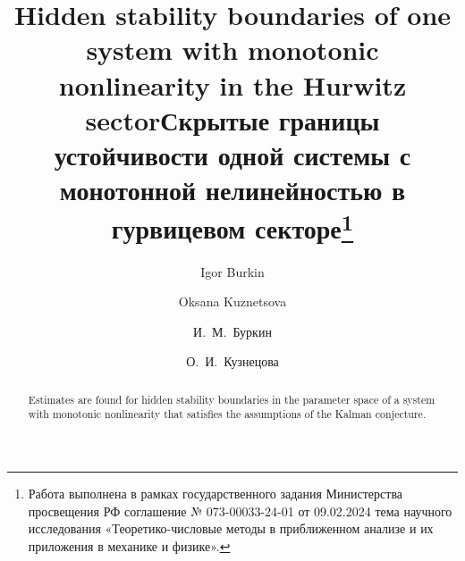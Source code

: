\begin{englishtitle} %
\title{Hidden stability boundaries of one system with monotonic nonlinearity in the Hurwitz sector}
\author{Igor Burkin  \and  Oksana Kuznetsova
}

\maketitle

\begin{abstract}
Estimates are found for hidden stability boundaries in the parameter space of a system with monotonic nonlinearity that satisfies the assumptions of the Kalman conjecture. 

\end{abstract}
\end{englishtitle}

\iffalse
%
%


\documentclass[12pt]{llncs}  


\usepackage{iftex}

\ifPDFTeX
\usepackage[T2A]{fontenc}
\usepackage[utf8]{inputenc} %
\usepackage[english,russian]{babel}
\fi

\usepackage{todonotes} 

\usepackage[russian]{nla}
\newcommand{\sign}{\mathop{\mathrm{sign}}}

\fi

\pagebreak

\title{Скрытые границы устойчивости одной системы с монотонной нелинейностью в гурвицевом секторе\thanks{Работа выполнена в рамках государственного задания Министерства просвещения РФ соглашение № 073-00033-24-01 от 09.02.2024 тема научного исследования «Теоретико-числовые методы в приближенном анализе и их приложения в механике и физике».}}
\author{И.~М.~Буркин \and О.~И.~Кузнецова
}

